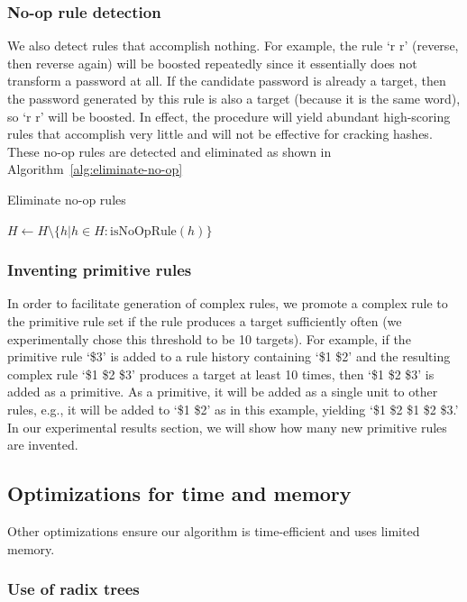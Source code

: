 \documentclass[letterpaper,twocolumn,10pt]{article}
\begin{document}
\subsubsection{No-op rule detection}

We also detect rules that accomplish nothing. For example, the rule `r r'
(reverse, then reverse again) will be boosted repeatedly since it essentially
does not transform a password at all. If the candidate password is already a
target, then the password generated by this rule is also a target (because it
is the same word), so `r r' will be boosted. In effect, the procedure will
yield abundant high-scoring rules that accomplish very little and will not be
effective for cracking hashes. These no-op rules are detected and eliminated as
shown in Algorithm~\ref{alg:eliminate-no-op}

\begin{algorithm}\caption{Eliminate no-op rules}
\begin{algorithmic}
    \State $H \gets H \setminus \{h|h\in H : \textrm{isNoOpRule}(h)\}$
\end{algorithmic}
\label{alg:eliminate-no-op}
\end{algorithm}

\subsubsection{Inventing primitive rules}

In order to facilitate generation of complex rules, we promote a complex rule
to the primitive rule set if the rule produces a target sufficiently often (we
experimentally chose this threshold to be 10 targets). For example, if the
primitive rule `\$3' is added to a rule history containing `\$1 \$2' and the
resulting complex rule `\$1 \$2 \$3' produces a target at least 10 times, then
`\$1 \$2 \$3' is added as a primitive. As a primitive, it will be added as a
single unit to other rules, e.g., it will be added to `\$1 \$2' as in this
example, yielding `\$1 \$2 \$1 \$2 \$3.' In our experimental results section,
we will show how many new primitive rules are invented.

\subsection{Optimizations for time and memory}

Other optimizations ensure our algorithm is time-efficient and uses limited
memory.

\subsubsection{Use of radix trees}
\end{document}
